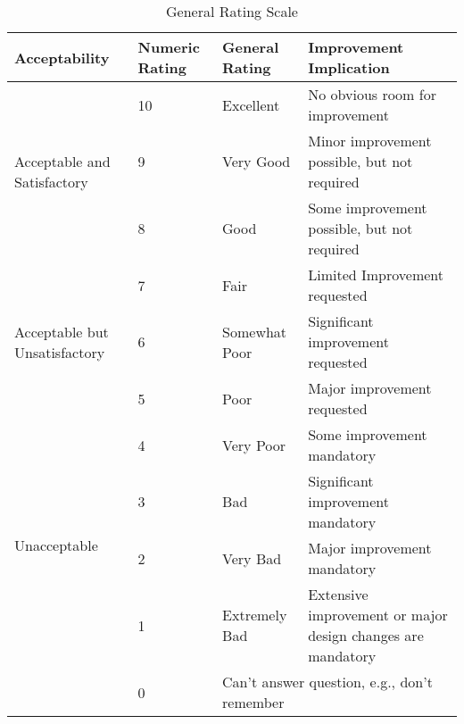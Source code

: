 \documentclass{article}
\begin{document}
\begin{table}[H]
\centering
\begin{tabular}{ p{2.75cm} p{2cm} p{2.75cm} p{4cm} }
\toprule
Acceptability &Numeric Rating & General Rating & Improvement Implication\\ \hline
\multirow{3}{2.75cm}{Acceptable and Satisfactory} & 10 & Excellent & No obvious room for improvement \\
 & 9 & Very Good & Minor improvement possible, but not required \\
 & 8 & Good & Some improvement possible, but not required \\ \hline
\multirow{3}{2.75cm}{Acceptable but Unsatisfactory} & 7 & Fair & Limited Improvement requested \\
 & 6 & Somewhat Poor & Significant improvement requested \\
 & 5 & Poor & Major improvement requested \\ \hline
\multirow{4}{2.75cm}{Unacceptable} & 4 & Very Poor & Some improvement mandatory \\
 & 3 & Bad & Significant improvement mandatory \\
 & 2 & Very Bad & Major improvement mandatory \\
 & 1 & Extremely Bad & Extensive improvement or major design changes are mandatory\\ \hline
 & 0 & \multicolumn{2}{l}{Can't answer question, e.g., don't remember} \\
\bottomrule
\end{tabular}
\caption[General Rating Scale]{General Rating Scale}
\label{tab:genRating}
\end{table}
\end{document}
